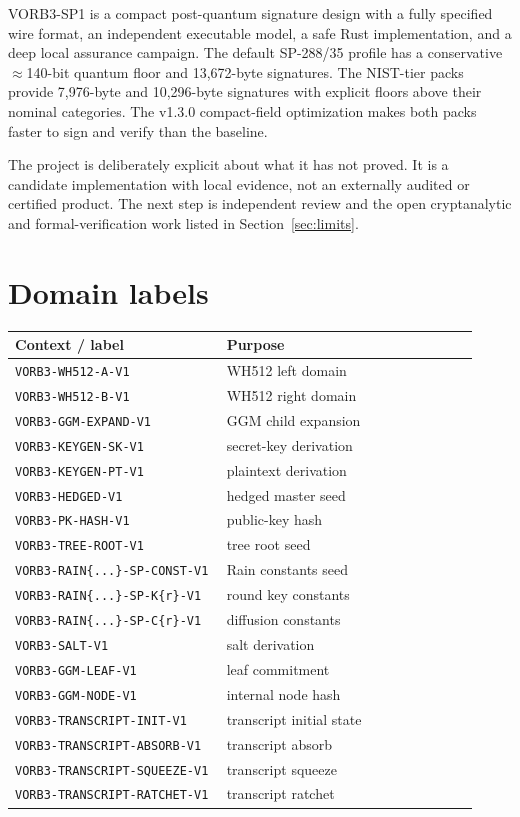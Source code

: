 \documentclass[11pt,a4paper]{article}
\begin{document}
VORB3-SP1 is a compact post-quantum signature design with a fully specified
wire format, an independent executable model, a safe Rust implementation, and
a deep local assurance campaign. The default SP-288/35 profile has a
conservative $\approx$140-bit quantum floor and 13,672-byte signatures. The
NIST-tier packs provide 7,976-byte and 10,296-byte signatures with explicit
floors above their nominal categories. The v1.3.0 compact-field optimization
makes both packs faster to sign and verify than the baseline.

The project is deliberately explicit about what it has not proved. It is a
candidate implementation with local evidence, not an externally audited or
certified product. The next step is independent review and the open
cryptanalytic and formal-verification work listed in
Section~\ref{sec:limits}.

\appendix

\section{Domain labels}

\begin{longtable}{@{}p{0.42\linewidth}p{0.5\linewidth}@{}}
\toprule
Context / label & Purpose \\
\midrule
\endhead
\texttt{VORB3-WH512-A-V1} & WH512 left domain \\
\texttt{VORB3-WH512-B-V1} & WH512 right domain \\
\texttt{VORB3-GGM-EXPAND-V1} & GGM child expansion \\
\texttt{VORB3-KEYGEN-SK-V1} & secret-key derivation \\
\texttt{VORB3-KEYGEN-PT-V1} & plaintext derivation \\
\texttt{VORB3-HEDGED-V1} & hedged master seed \\
\texttt{VORB3-PK-HASH-V1} & public-key hash \\
\texttt{VORB3-TREE-ROOT-V1} & tree root seed \\
\texttt{VORB3-RAIN\{...\}-SP-CONST-V1} & Rain constants seed \\
\texttt{VORB3-RAIN\{...\}-SP-K\{r\}-V1} & round key constants \\
\texttt{VORB3-RAIN\{...\}-SP-C\{r\}-V1} & diffusion constants \\
\texttt{VORB3-SALT-V1} & salt derivation \\
\texttt{VORB3-GGM-LEAF-V1} & leaf commitment \\
\texttt{VORB3-GGM-NODE-V1} & internal node hash \\
\texttt{VORB3-TRANSCRIPT-INIT-V1} & transcript initial state \\
\texttt{VORB3-TRANSCRIPT-ABSORB-V1} & transcript absorb \\
\texttt{VORB3-TRANSCRIPT-SQUEEZE-V1} & transcript squeeze \\
\texttt{VORB3-TRANSCRIPT-RATCHET-V1} & transcript ratchet \\
\bottomrule
\end{longtable}
\end{document}
